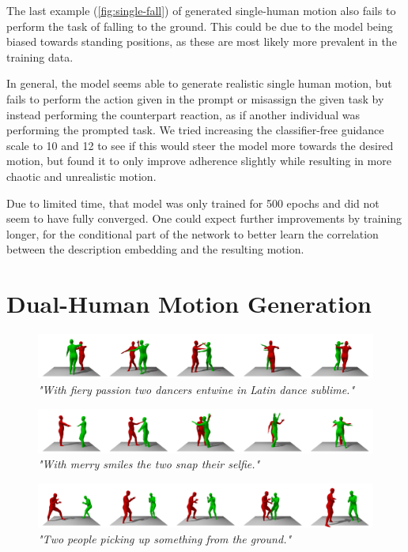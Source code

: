 The last example (\cref{fig:single-fall}) of generated single-human motion also fails to perform the task of falling to the ground. This could be due to the model being biased towards standing positions, as these are most likely more prevalent in the training data. 

In general, the model seems able to generate realistic single human motion, but fails to perform the action given in the prompt or misassign the given task by instead performing the counterpart reaction, as if another individual was performing the prompted task. We tried increasing the classifier-free guidance scale to 10 and 12 to see if this would steer the model more towards the desired motion, but found it to only improve adherence slightly while resulting in more chaotic and unrealistic motion. 

Due to limited time, that model was only trained for 500 epochs and did not seem to have fully converged. One could expect further improvements by training longer, for the conditional part of the network to better learn the correlation between the description embedding and the resulting motion.


\section*{Dual-Human Motion Generation}

\begin{figure}[H]
    \centering
    \includegraphics[width=\linewidth]{figures/results/multi-passion.png}
    \caption{\textit{"With fiery passion two dancers entwine in Latin dance sublime."}}
\end{figure}


\begin{figure}[H]
    \centering
    \includegraphics[width=\linewidth]{figures/results/multi-selfie.png}
    \caption{\textit{"With merry smiles the two snap their selfie."}}
\end{figure}


\begin{figure}[H]
    \centering
    \includegraphics[width=\linewidth]{figures/results/multi-pick-up.png}
    \caption{\textit{"Two people picking up something from the ground."}}
\end{figure}

